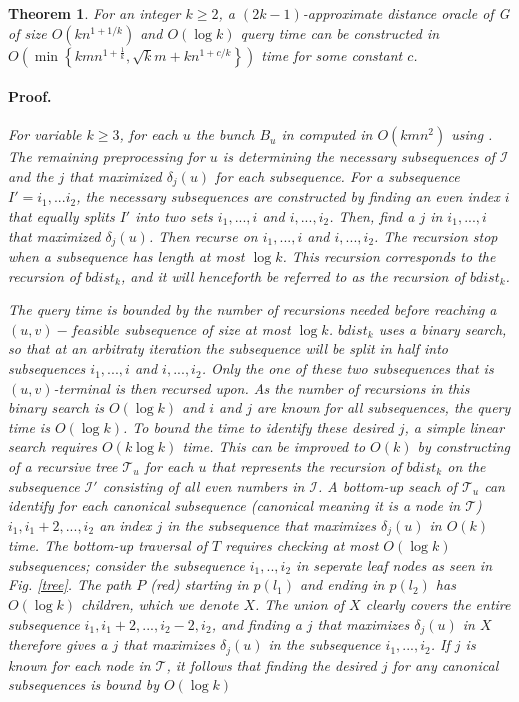 \documentclass[12pt]{article}
\newtheorem{thm}{Theorem}[section]
\begin{document}
\begin{thm}
For an integer $k\geq 2$, a $(2k - 1)$-approximate distance oracle of G of size $O(kn^{1+1/k})$ and $O(\log k)$ query time can be constructed in $O\left( \min \left\lbrace kmn^{1+\frac{1}{k}}, \sqrt{k}m + kn^{1+c/k}\right\rbrace\right)$ time for some constant $c$.

\paragraph{Proof.} 

For variable $k\geq 3$, for each $u$ the bunch $B_u$ in computed in $O(kmn^{2})$ using \cite{Thorup2005}. The remaining preprocessing for $u$ is determining the necessary subsequences of $\mathcal{I}$ and the $j$ that maximized $\delta_j(u)$ for each subsequence.
For a subsequence $I'=i_1,...i_2$, the necessary subsequences are constructed by finding an even index $i$ that equally splits $I'$ into two sets $i_1,...,i$ and $i,...,i_2$. Then, find a $j$ in $i_1,...,i$ that maximized $\delta_j(u)$. Then recurse on $i_1,...,i$ and $i,...,i_2$. The recursion stop when a subsequence has length at most $\log k$. This recursion corresponds to the recursion of $bdist_k$, and it will henceforth be referred to as the recursion of $bdist_k$.

The query time is bounded by the number of recursions needed before reaching a $(u,v)-feasible$ subsequence of size at most $\log k$. $bdist_k$ uses a binary search, so that at an arbitraty iteration the subsequence will be split in half into subsequences $i_1,...,i$ and $i,...,i_2$. Only the one of these two subsequences that is $(u,v)$-terminal is then recursed upon. As the number of recursions in this binary search is $O(\log k)$ and $i$ and $j$ are known for all subsequences, the query time is $O(\log k)$.
To bound the time to identify these desired $j$, a simple linear search requires $O(k\log k)$ time. This can be improved to $O(k)$ by constructing of a recursive tree $\mathcal{T}_u$ for each $u$ that represents the recursion of $bdist_k$ on the subsequence $\mathcal{I}'$ consisting of all even numbers in $\mathcal{I}$. A bottom-up seach of $\mathcal{T}_u$ can identify for each canonical subsequence (canonical meaning it is a node in $\mathcal{T}$) $i_1,i_1+2,...,i_2$ an index $j$ in the subsequence that maximizes $\delta_j(u)$ in $O(k)$ time. The bottom-up traversal of $T$ requires checking at most $O(\log k)$ subsequences; consider the subsequence $i_1,..,i_2$ in seperate leaf nodes as seen in Fig. \ref{tree}. The path $P$ (red) starting in $p(l_1)$ and ending in $p(l_2)$ has $O(\log k)$ children, which we denote $X$. The union of $X$ clearly covers the entire subsequence $i_1,i_1+2,...,i_2-2,i_2$, and finding a $j$ that maximizes $\delta_j(u)$ in $X$ therefore gives a $j$ that maximizes $\delta_j(u)$ in the subsequence $i_1,...,i_2$. If $j$ is known for each node in $\mathcal{T}$, it follows that finding the desired $j$ for any canonical subsequences is bound by $O(\log k)$\\


\end{thm}
\end{document}
